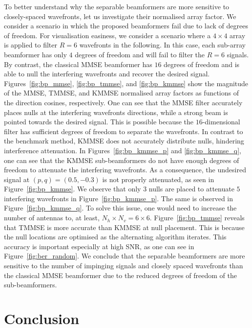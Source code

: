 \documentclass{cta-author}
\begin{document}
To better understand why the separable beamformers are more sensitive to closely-spaced wavefronts, let us investigate their normalised array factor. We consider a scenario in which the proposed beamformers fail due to lack of degrees of freedom. For visualisation easiness, we consider a scenario where a $4\times 4$ array is applied to filter $R=6$ wavefronts in the following. In this case, each sub-array beamformer has only $4$ degrees of freedom and will fail to filter the $R=6$ signals. By contrast, the classical MMSE beamformer has $16$ degrees of freedom and is able to null the interfering wavefronts and recover the desired signal. Figures~\ref{fig:bp_mmse}, \ref{fig:bp_tmmse}, and \ref{fig:bp_kmmse}  show the magnitude of the MMSE, TMMSE, and KMMSE normalised array factors as functions of the direction cosines, respectively. One can see that the MMSE filter accurately places nulls at the interfering wavefronts directions, while a strong beam is pointed towards the desired signal. This is possible because the $16$-dimensional filter has sufficient degrees of freedom to separate the wavefronts. In contrast to the benchmark method, KMMSE does not accurately distribute nulls, hindering interference attenuation. In Figures~\ref{fig:bp_kmmse_p} and \ref{fig:bp_kmmse_q}, one can see that the KMMSE sub-beamformers do not have enough degrees of freedom to attenuate the interfering wavefronts. As a consequence, the undesired signal at $(p,q) =(0.5,-0.3)$ is not properly attenuated, as seen in Figure~\ref{fig:bp_kmmse}. We observe that only $3$ nulls are placed to attenuate $5$ interfering wavefronts in Figure~\ref{fig:bp_kmmse_p}. The same is observed in Figure~\ref{fig:bp_kmmse_q}. To solve this issue, one would need to increase the number of antennas to, at least, $N_h \times N_v = 6\times 6$. Figure~\ref{fig:bp_tmmse} reveals that TMMSE is more accurate than KMMSE at null placement. This is because the null locations are optimised as the alternating algorithm iterates. This accuracy is important especially at high SNR, as one can see in Figure~\ref{fig:ber_random}. We conclude that the separable beamformers are more sensitive to the number of impinging signals and closely spaced wavefronts than the classical MMSE beamformer due to the reduced degrees of freedom of the sub-beamformers. 

\section{Conclusion} \label{sec:conc}
\end{document}
